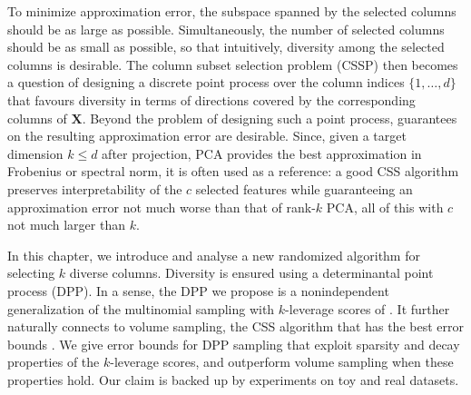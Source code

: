 \documentclass[twoside,11pt]{book}
\numberwithin{theorem}{chapter}
\numberwithin{definition}{chapter}
\numberwithin{proposition}{chapter}
\numberwithin{corollary}{chapter}
\numberwithin{example}{chapter}
\numberwithin{lemma}{chapter}
\numberwithin{assumption}{chapter}
\numberwithin{equation}{chapter}
\numberwithin{figure}{chapter}
\newcommand{\pc}[1]{\textcolor{blue}{#1}}
\begin{document}
To minimize approximation error, the subspace spanned by the selected columns should be as large as possible. Simultaneously, the number of selected columns should be as small as possible, so that intuitively, diversity among the selected columns is desirable. The column subset selection problem (CSSP) then becomes a question of designing a discrete point process over the column indices $\{1,\dots,d\}$ that favours diversity in terms of directions covered by the corresponding columns of $\bm{X}$.
Beyond the problem of designing such a point process, guarantees on the resulting approximation error are desirable. Since, given a target dimension $k\leq d$ after projection, PCA provides the best approximation in Frobenius or spectral norm, it is often used as a reference: a good CSS algorithm preserves interpretability of the $c$ selected features while guaranteeing an approximation error not much worse than that of rank-$k$ PCA, all of this with $c$ not much larger than $k$.

In this chapter, we introduce and analyse a new randomized algorithm for selecting $k$ diverse columns. Diversity is ensured using a determinantal point process (DPP). 
In a sense, the DPP we propose is a nonindependent generalization of the multinomial sampling with $k$-leverage scores of \cite{BoMaDr09}. It further naturally connects to volume sampling, the CSS algorithm that has the best error bounds \citep{DRVW06}. We give error bounds for DPP sampling that exploit sparsity and decay properties of the $k$-leverage scores, and outperform volume sampling when these properties hold. Our claim is backed up by experiments on toy and real datasets.
\end{document}
